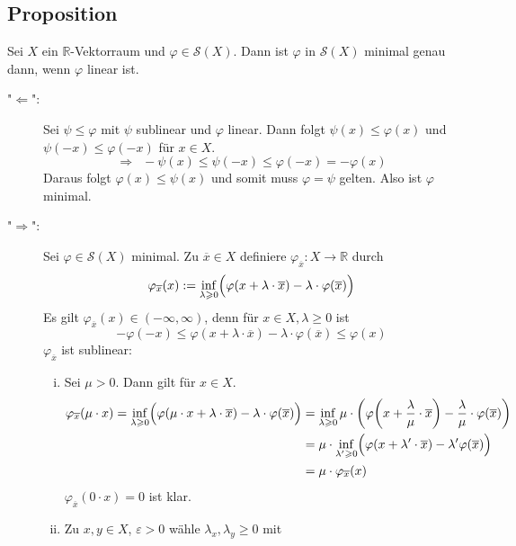 \subsection[Propostion: Minimale Elemente in $\mathcal{S}(X)$ sind genau die lineare Abbildungen]{Proposition} %
\label{sub:220}
Sei $X$ ein $\mathds{R}$-Vektorraum und $\varphi \in \mathcal{S}(X)$. Dann ist $\varphi$ in $\mathcal{S}(X)$ minimal genau dann, wenn $\varphi$ linear ist.
\begin{description}
	\item["$\Leftarrow$":] Sei $\psi \le \varphi$ mit $\psi$ sublinear und $\varphi$ linear. Dann folgt $\psi(x) \le \varphi(x)$ und $\psi(-x) \le \varphi(-x)$ für 
	$x \in X$.
	\[
		 \Longrightarrow \enspace- \psi(x) \le \psi(-x) \le \varphi(-x) = - \varphi(x)
	\]
	Daraus folgt $\varphi(x) \le \psi(x)$ und somit muss $\varphi=\psi$ gelten. Also ist $\varphi$ minimal.
	\item["$\Rightarrow $":] Sei $\varphi \in \mathcal{S}(X)$ minimal. Zu $\overline{x} \in X$ definiere $\varphi_{\overline{x}} : X \to \mathds{R}$ durch
	\[
		\varphi_{\overline{x}}(x) := \inf_{\lambda \ge 0} \enbrace[\Big]{\varphi \enbrace*{x+ \lambda \cdot \overline{x} } - \lambda \cdot \varphi(\overline{x})}
	\]
	Es gilt $\varphi_{\overline{x}}(x) \in (-\infty,\infty)$, denn für $x \in X, \lambda \ge 0$ ist 
	\[
		-\varphi(-x) \le \varphi(x+ \lambda \cdot \overline{x}) - \lambda  \cdot \varphi(\overline{x}) \le \varphi(x)
	\]
	$\varphi_{\overline{x}}$ ist sublinear:
	\begin{enumerate}[(i)]
		\item Sei $\mu >0$. Dann gilt für $x \in X$.
		\begin{align*}
			\varphi_{\overline{x}}(\mu \cdot x) = \inf_{\lambda \ge 0} \enbrace[\Big]{ \varphi \enbrace*{\mu \cdot x + \lambda  \cdot \overline{x} } 
			- \lambda \cdot \varphi(\overline{x} )} &= \inf_{\lambda \ge 0 } \mu \cdot  \enbrace*{ \varphi \enbrace*{x + \frac{\lambda }{\mu} \cdot \overline{x}}
			- \frac{\lambda }{\mu} \cdot \varphi(\overline{x} )  } \\
			&= \mu \cdot \inf_{\lambda' \ge 0} \enbrace[\Big]{ \varphi \enbrace*{x+ \lambda' \cdot \overline{x} } - \lambda' \varphi(\overline{x})} \\
			&= \mu \cdot \varphi_{\overline{x}}(x) 
		\end{align*}
		$\varphi_{\overline{x}}(0 \cdot x) = 0$ ist klar.
		\item Zu $x,y \in X$, $\varepsilon>0$ wähle $\lambda_x, \lambda_y \ge 0$ mit 

\end{enumerate}
\end{description}
